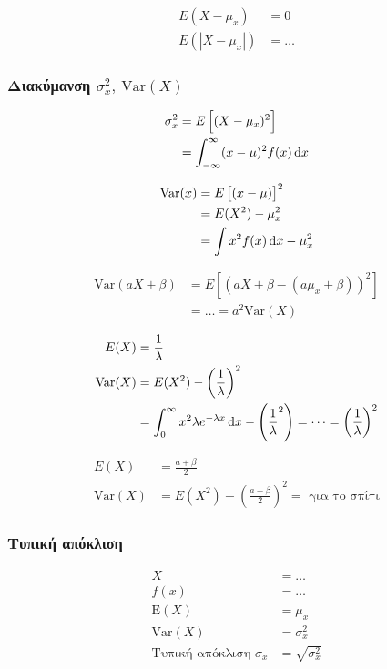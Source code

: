 \documentclass[11pt,a4paper,titlepage,draft]{article}
\begin{document}
\begin{align*}
E(X-\mu_x)&=0\\
E\left(|X-\mu_x|\right) &= \dots
\end{align*}

\subsubsection{Διακύμανση \(\sigma^2_x, \ \mathrm{Var}(X)\)}
\begin{align*}
\sigma_x^2 &= E \left[ (X-\mu_x)^2\right] \\
&= \int_{-\infty}^\infty (x-\mu)^2f(x)\dif x
\end{align*}

\begin{align*}
\mathrm{Var}(x) &= E \left[(x-\mu)\right]^2
\\ &= E(X^2)-\mu_x^2
\\ &= \int x^2f(x)\dif x - \mu_x^2
\end{align*}

\begin{align*}
\mathrm{Var}(aX+\beta) &= E\left[
\left(
aX+\beta -(a\mu_x+\beta)
\right)^2
\right] \\
&= \dots = a^2\mathrm{Var}(X)
\end{align*}

\begin{align*}
E(X) &= \frac{1}{\lambda} \\
\mathrm{Var}(X) &= E(X^2)-\left(\frac{1}{\lambda}\right)^2 \\
&= \int_0^\infty x^2\lambda e^{-\lambda x} \dif x - \left(
\frac{1}{\lambda}^2
\right) = \dots = \left( \frac{1}{\lambda} \right)^2
\end{align*}

\begin{align*}
E(X)&=\frac{a+\beta}{2}\\
\mathrm{Var}(X)&=E(X^2)-\left(\frac{a+\beta}{2}\right)^2=\text{ για το σπίτι}
\end{align*}

\subsubsection{Τυπική απόκλιση}
\begin{align*}
X&=\dots\\
f(x)&=\dots\\
\mathrm E(X) &= \mu_x\\
\mathrm{Var}(X) &= \sigma_x^2\\
\text{Τυπική απόκλιση } \sigma_x &= \sqrt{\sigma_x^2}
\end{align*}
\end{document}
